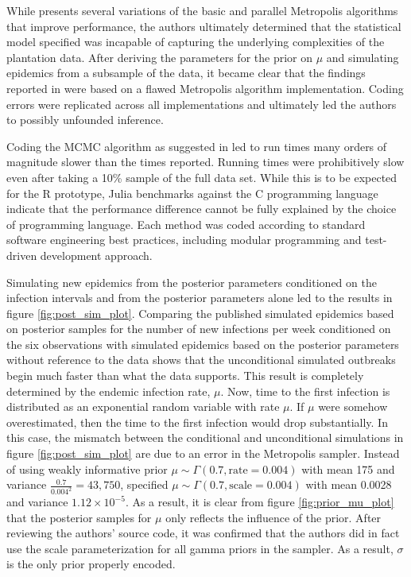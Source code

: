 \documentclass{uwstat572}
\begin{document}
While \citet{Brown} presents several variations of the basic and parallel Metropolis algorithms that improve performance, the authors ultimately determined that the statistical model specified was incapable of capturing the underlying complexities of the plantation data. 
After deriving the parameters for the prior on $\mu$ and simulating epidemics from a subsample of the data, it became clear that the findings reported in \citet{Brown} were based on a flawed Metropolis algorithm implementation. 
Coding errors were replicated across all implementations and ultimately led the authors to possibly unfounded inference. 

Coding the MCMC algorithm as suggested in \citet{Brown} led to run times many orders of magnitude slower than the times reported. 
Running times were prohibitively slow even after taking a 10\% sample of the full data set. 
While this is to be expected for the R prototype, Julia benchmarks against the C programming language indicate that the performance difference cannot be fully explained by the choice of programming language. 
Each method was coded according to standard software engineering best practices, including modular programming and test-driven development approach.  

Simulating new epidemics from the posterior parameters conditioned on the infection intervals and from the posterior parameters alone led \citet{Brown} to the results in figure \ref{fig:post_sim_plot}. 
Comparing the published simulated epidemics based on posterior samples for the number of new infections per week conditioned on the six observations with simulated epidemics based on the posterior parameters without reference to the data shows that the unconditional simulated outbreaks begin much faster than what the data supports. 
This result is completely determined by the endemic infection rate, $\mu$. 
Now, time to the first infection is distributed as an exponential random variable with rate $\mu$. 
If $\mu$ were somehow overestimated, then the time to the first infection would drop substantially.
In this case, the mismatch between the conditional and unconditional simulations in figure \ref{fig:post_sim_plot} are due to an error in the Metropolis sampler. 
Instead of using weakly informative prior $\mu \sim \Gamma(0.7, \text{rate}=0.004)$ with mean 175 and variance $\frac{0.7}{0.004^2}=43,750$, \citep{Brown} specified $\mu \sim \Gamma(0.7, \text{scale}=0.004)$ with mean 0.0028 and variance $1.12\times10^{-5}$. 
As a result, it is clear from figure \ref{fig:prior_mu_plot} that the posterior samples for $\mu$ only reflects the influence of the prior. 
After reviewing the authors' source code, it was confirmed that the authors did in fact use the scale parameterization for all gamma priors in the sampler. 
As a result, $\sigma$ is the only prior properly encoded. 
\end{document}

